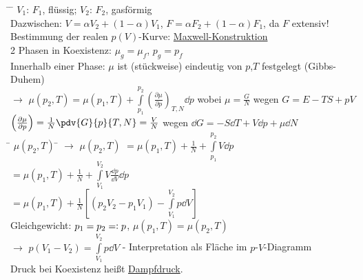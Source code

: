 \begin{tabbing}
\hspace{4em} \= \hspace{4em} \= \kill
$V_1$: $F_1$, flüssig; $V_2$: $F_2$, gasförmig\\
Dazwischen: $V = \alpha V_2 + (1 - \alpha) V_1$, $F = \alpha F_2 + (1 - \alpha) F_1$, da $F$ extensiv!\\
Bestimmung der realen $p(V)$-Kurve: \underline{Maxwell-Konstruktion}\\
2 Phasen in Koexistenz: $\mu_g = \mu_f$, $p_g = p_f$\\
Innerhalb einer Phase: $\mu$ ist (stückweise) eindeutig von $p$,$T$ festgelegt (Gibbs-Duhem)\\
$\rightarrow$\> $\mu(p_2,T) = \mu(p_1,T) + \int\limits_{p_1}^{p_2}\left(\frac{\partial \mu}{\partial p}\right)_{T,N} \dd{p}$ wobei $\mu = \frac{G}{N}$ wegen $G = E - TS + pV$\\
\> $\left(\frac{\partial \mu}{\partial p}\right) = \frac{1}{N} \pdv{G}{p}{T,N} = \frac{V}{N}$ wegen $\dd{G} = -S\dd{T}+V\dd{p}+\mu\dd{N}$\\
\hspace{4em} \= $\mu(p_2,T)$ \= \kill
$\rightarrow$\> $\mu(p_2,T)$ $= \mu(p_1,T) + \frac{1}{N} + \int\limits_{p_1}^{p_2}V \dd{p}$\\
\>\> $= \mu(p_1,T) + \frac{1}{N} + \int\limits_{V_1}^{V_2} V \frac{\dd{p}}{\dd{V}}\dd{p}$\\
\>\> $= \mu(p_1,T) + \frac{1}{N}\left[\left(p_2V_2-p_1V_1\right) -\int\limits_{V_1}^{V_2} p \dd{V}\right]$\\
Gleichgewicht: $p_1=p_2 = \vcentcolon p$, $\mu(p_1,T) = \mu (p_2,T)$\\
$\rightarrow$\> $p(V_1 - V_2) = \int\limits_{V_1}^{V_2}p \dd{V}$ - Interpretation als Fläche im $p$-$V$-Diagramm\\
Druck bei Koexistenz heißt \underline{Dampfdruck}.
\end{tabbing}
